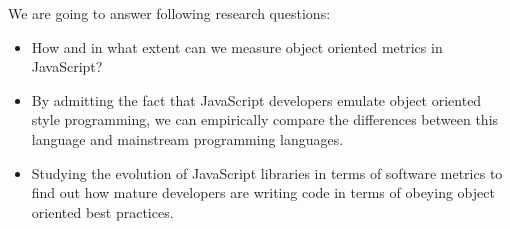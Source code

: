 
We are going to answer following research questions:


\rqi



\rqii



\rqiii




\begin{itemize}
	\item How and in what extent can we measure object oriented metrics in JavaScript?
	\item  By admitting the fact that JavaScript developers emulate object oriented style programming, we can empirically compare the differences between this language and mainstream programming languages.
	\item Studying the evolution of JavaScript libraries in terms of software metrics to find out how mature developers are writing code in terms of obeying object oriented best practices.
\end{itemize}
	

	
	

